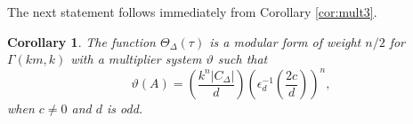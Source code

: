 \documentclass[11pt,a4paper]{amsart}
\newtheorem{lemma}[theorem]{Lemma}
\newtheorem{corollary}[theorem]{Corollary}
\theoremstyle{definition}
\begin{document}
The next statement follows immediately from Corollary \ref{cor:mult3}.
\begin{corollary}
	\label{cor:thetazetamult} 
	The function $\Theta_{\Delta}(\tau)$ is a modular form of weight $n/2$ for $\Gamma(km,k)$ with a multiplier system $\vartheta$ such that
	\[ \vartheta(A)=\left(\frac{k^n|C_{\Delta}|}{d}\right)\left(\epsilon^{-1}_d \left(\frac{2c}{d}\right)\right)^n, \]
	when $c\neq 0$ and $d$ is odd.
	
	
\end{corollary}



\end{document}
